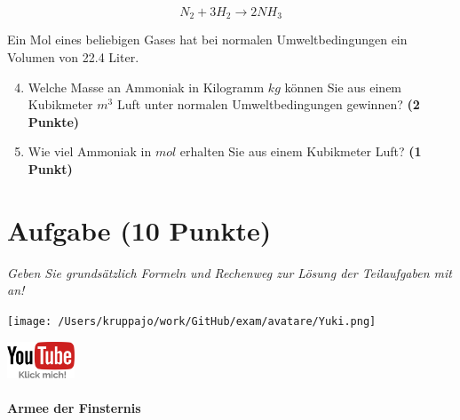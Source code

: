 \documentclass[a4paper, 9pt]{scrartcl}\usepackage[]{graphicx}\usepackage[]{xcolor}
\begin{document}
\begin{equation*}
  N_2 + 3H_2 \rightarrow 2NH_3
\end{equation*}  

Ein Mol eines beliebigen Gases hat bei normalen Umweltbedingungen ein Volumen von 22.4 Liter. %

\begin{enumerate}
  \setcounter{enumi}{3}
\item Welche Masse an Ammoniak in Kilogramm $kg$ können Sie aus einem Kubikmeter $m^3$ Luft unter normalen Umweltbedingungen gewinnen?
  \textbf{(2 Punkte)}
\item Wie viel Ammoniak in $mol$ erhalten Sie aus einem Kubikmeter Luft? \textbf{(1 Punkt)}
\end{enumerate}

 
\clearpage

\section{Aufgabe \hfill (10 Punkte)}

\textit{Geben Sie grundsätzlich Formeln und Rechenweg zur Lösung der Teilaufgaben mit an!} \\[1Ex]
 

 
\begin{minipage}[t]{0.5\textwidth}
\texttt{[image: /Users/kruppajo/work/GitHub/exam/avatare/Yuki.png]}
\end{minipage}
\begin{minipage}[t]{0.5\textwidth}
\hfill
\href{https://youtu.be/Bbu6n8MXxQk}{\includegraphics[width = 2cm]{img/youtube}}
\end{minipage}




\paragraph{Armee der Finsternis}
\end{document}
